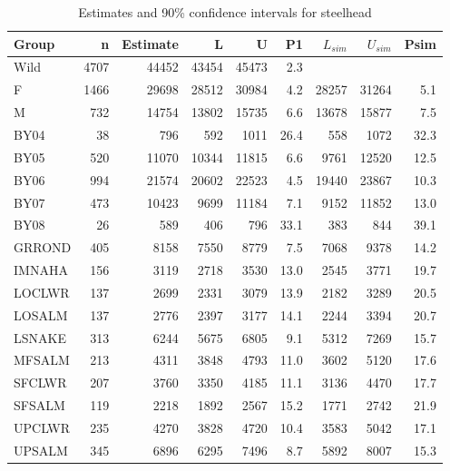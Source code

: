 \documentclass[%
                leqno,         %
%
]{nrc1}                          %
\begin{document}
\begin{table}
\caption{Estimates and 90\% confidence intervals for steelhead}
\label{table:SHresults90} 
\begin{center}
\begin{tabular}{|l|r|r|r|r|r|r|r|r|}
\hline Group &n& Estimate & L & U & P1 & $L_{sim}$ & $U_{sim}$ & Psim \\ 
\hline  Wild&4707&44452  &43454  &45473  & 2.3  & & &  \\ 
\hline  F&1466&29698&28512&30984&4.2&28257&31264&5.1  \\
\hline  M&732&14754&13802&15735&6.6&13678&15877&7.5  \\
\hline  BY04&38&796&592&1011&26.4&558&1072&32.3  \\
\hline  BY05&520&11070&10344&11815&6.6&9761&12520&12.5  \\
\hline  BY06&994&21574&20602&22523&4.5&19440&23867&10.3  \\
\hline  BY07&473&10423&9699&11184&7.1&9152&11852&13.0  \\
\hline  BY08&26&589&406&796&33.1&383&844&39.1  \\
\hline  GRROND &405&8158 &7550 &8779 &7.5  &7068 &9378 &14.2  \\ 
\hline  IMNAHA &156&3119 &2718 &3530 &13.0  &2545 &3771 &19.7  \\ 
\hline  LOCLWR &137&2699 &2331 &3079 &13.9  &2182 &3289 &20.5  \\ 
\hline  LOSALM &137&2776 &2397 &3177 &14.1  &2244 &3394 &20.7  \\ 
\hline  LSNAKE &313&6244 &5675 &6805 &9.1  &5312 &7269 &15.7  \\ 
\hline  MFSALM &213&4311 &3848 &4793 &11.0  &3602 &5120 &17.6  \\ 
\hline  SFCLWR &207&3760 &3350 &4185 &11.1  &3136 &4470 &17.7  \\ 
\hline  SFSALM &119&2218 &1892 &2567 &15.2  &1771 &2742 &21.9  \\ 
\hline  UPCLWR &235&4270 &3828 &4720 &10.4  &3583 &5042 &17.1  \\ 
\hline  UPSALM &345&6896 &6295 &7496 &8.7  &5892 &8007 &15.3  \\
\hline 
\end{tabular}
\end{center}
\end{table}
\end{document}

